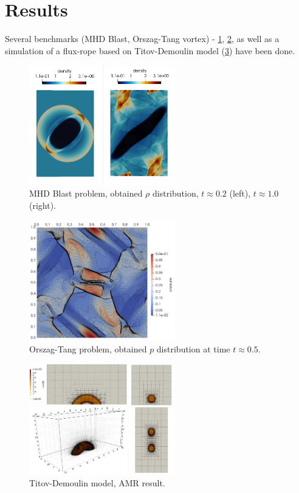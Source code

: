 \documentclass[journal,transmag]{IEEEtran}
\begin{document}
\section{Results}
Several benchmarks (MHD Blast, Orszag-Tang vortex) - \ref{figure:blastFinal}, \ref{figure:ot}, as well as a simulation of a flux-rope based on Titov-Demoulin model (\ref{figure:td}) have been done.
\begin{figure}
	\begin{center}
		\includegraphics[width=2.5in]{ref-result.jpg}
	\caption{MHD Blast problem, obtained $\rho$ distribution, $t \approx 0.2$ (left), $t \approx 1.0$ (right).}
	\label{figure:blastFinal}
	\end{center}
\end{figure}
\begin{figure}
	\begin{center}
		\includegraphics[width=2.5in]{ot.jpg}
	\caption{Orszag-Tang problem, obtained $p$ distribution at time $t \approx 0.5$.}
	\label{figure:ot}
	\end{center}
\end{figure}

\begin{figure}
	\begin{center}
		\includegraphics[width=2.5in]{td6.jpg}
	\caption{Titov-Demoulin model, AMR result.}
	\label{figure:td}
	\end{center}
\end{figure}
\end{document}
